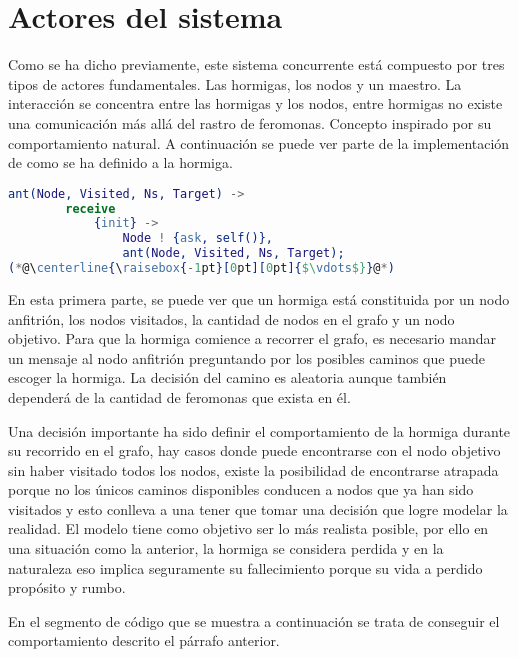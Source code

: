 \documentclass[
12pt, %
letterpaper, %
oneside, %
headinclude,footinclude, %
BCOR5mm, %
]{scrartcl}
\begin{document}
\section{Actores del sistema}

Como se ha dicho previamente, este sistema concurrente está compuesto por tres tipos de actores fundamentales. Las hormigas, los nodos y un maestro. La interacción se concentra entre las hormigas y los nodos, entre hormigas no existe una comunicación más allá del rastro de feromonas. Concepto inspirado por su comportamiento natural. A continuación se puede ver parte de la implementación de como se ha definido a la hormiga.

\begin{lstlisting}[language=Erlang]
    ant(Node, Visited, Ns, Target) ->
        receive
            {init} ->
                Node ! {ask, self()},
                ant(Node, Visited, Ns, Target);
(*@\centerline{\raisebox{-1pt}[0pt][0pt]{$\vdots$}}@*)
\end{lstlisting}

En esta primera parte, se puede ver que un hormiga está constituida por un nodo anfitrión, los nodos visitados, la cantidad de nodos en el grafo y un nodo objetivo. Para que la hormiga comience a recorrer el grafo, es necesario mandar un mensaje al nodo anfitrión preguntando por los posibles caminos que puede escoger la hormiga. La decisión del camino es aleatoria aunque también dependerá de la cantidad de feromonas que exista en él.

Una decisión importante ha sido definir el comportamiento de la hormiga durante su recorrido en el grafo, hay casos donde puede encontrarse con el nodo objetivo sin haber visitado todos los nodos, existe la posibilidad de encontrarse atrapada porque no los únicos caminos disponibles conducen a nodos que ya han sido visitados y esto conlleva a una tener que tomar una decisión que logre modelar la realidad. El modelo tiene como objetivo ser lo más realista posible, por ello en una situación como la anterior, la hormiga se considera perdida y en la naturaleza eso implica seguramente su fallecimiento porque su vida a perdido propósito y rumbo.

En el segmento de código que se muestra a continuación se trata de conseguir el comportamiento descrito el párrafo anterior.
\end{document}

